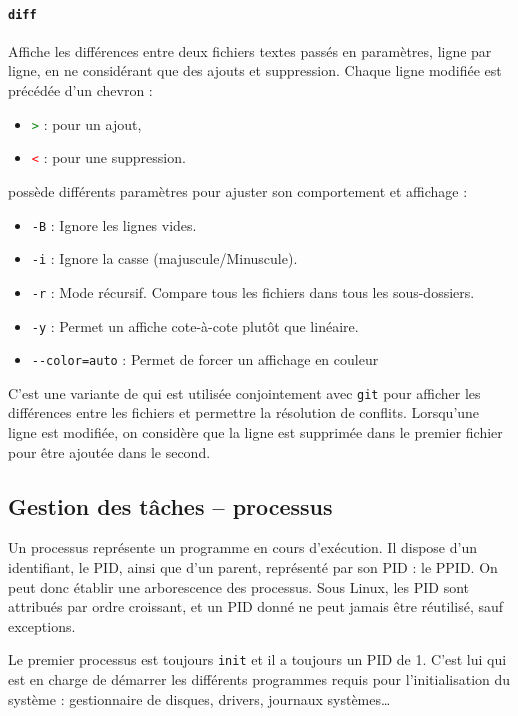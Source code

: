 \paragraph{\texttt{diff}} 
Affiche les différences entre deux fichiers textes passés en paramètres, ligne par ligne, en ne considérant que des ajouts et suppression. Chaque ligne modifiée est précédée d'un chevron :
\begin{itemize}
    \item \textcolor{green}{\texttt{>}} : pour un ajout,
    \item \textcolor{red}{\texttt{<}} : pour une suppression.
\end{itemize}
 possède différents paramètres pour ajuster son comportement et affichage :
\begin{itemize}
    \item \texttt{-B} : Ignore les lignes vides.
    \item \texttt{-i} : Ignore la casse (majuscule/Minuscule).
    \item \texttt{-r} : Mode récursif. Compare tous les fichiers dans tous les sous-dossiers.
    \item \texttt{-y} : Permet un affiche cote-à-cote plutôt que linéaire.
    \item \texttt{-{}-color=auto} : Permet de forcer un affichage en couleur
\end{itemize}
\vspace{5mm}

 C'est une variante de  qui est utilisée conjointement avec \texttt{git} pour afficher les différences entre les fichiers et permettre la résolution de conflits. Lorsqu'une ligne est modifiée, on considère que la ligne est supprimée dans le premier fichier pour être ajoutée dans le second.

\newpage

\subsection{Gestion des tâches -- processus}

Un processus représente un programme en cours d'exécution. Il dispose d'un identifiant, le PID, ainsi que d'un parent, représenté par son PID : le PPID. On peut donc établir une arborescence des processus.
Sous Linux, les PID sont attribués par ordre croissant, et un PID donné ne peut jamais être réutilisé, sauf exceptions.

Le premier processus est toujours \texttt{init} et il a toujours un PID de 1. C'est lui qui est en charge de démarrer les différents programmes requis pour l'initialisation du système : gestionnaire de disques, drivers, journaux systèmes\dots


